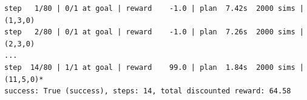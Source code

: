 \begin{lstlisting}[style=terminal,keepspaces=true]
step   1/80 | 0/1 at goal | reward    -1.0 | plan  7.42s  2000 sims | (1,3,0)
step   2/80 | 0/1 at goal | reward    -1.0 | plan  7.26s  2000 sims | (2,3,0)
...
step  14/80 | 1/1 at goal | reward    99.0 | plan  1.84s  2000 sims | (11,5,0)*
success: True (success), steps: 14, total discounted reward: 64.58
\end{lstlisting}
